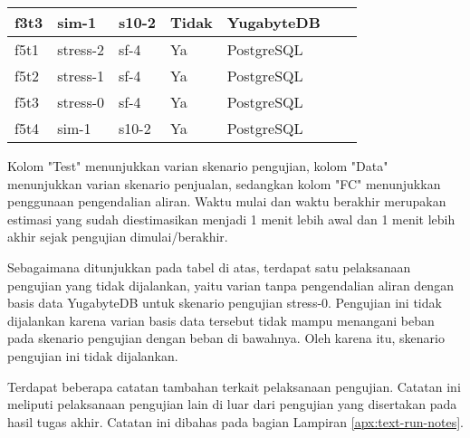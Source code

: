 \begin{table}[H]
\begin{tabular}{|l|l|l|l|l|l|l|}
        f3t3        & sim-1                 & s10-2             & Tidak                        & YugabyteDB          \\ \hline
        f5t1        & stress-2              & sf-4              & Ya                           & PostgreSQL          \\ \hline
        f5t2        & stress-1              & sf-4              & Ya                           & PostgreSQL          \\ \hline
        f5t3        & stress-0              & sf-4              & Ya                           & PostgreSQL          \\ \hline
        f5t4        & sim-1                 & s10-2             & Ya                           & PostgreSQL          \\ \hline
    \end{tabular}
\end{table}

Kolom "Test" menunjukkan varian skenario pengujian, kolom "Data" menunjukkan varian skenario penjualan, sedangkan kolom "FC" menunjukkan penggunaan pengendalian aliran. Waktu mulai dan waktu berakhir merupakan estimasi yang sudah diestimasikan menjadi 1 menit lebih awal dan 1 menit lebih akhir sejak pengujian dimulai/berakhir.

Sebagaimana ditunjukkan pada tabel di atas, terdapat satu pelaksanaan pengujian yang tidak dijalankan, yaitu varian tanpa pengendalian aliran dengan basis data YugabyteDB untuk skenario pengujian stress-0. Pengujian ini tidak dijalankan karena varian basis data tersebut tidak mampu menangani beban pada skenario pengujian dengan beban di bawahnya. Oleh karena itu, skenario pengujian ini tidak dijalankan.

Terdapat beberapa catatan tambahan terkait pelaksanaan pengujian. Catatan ini meliputi pelaksanaan pengujian lain di luar dari pengujian yang disertakan pada hasil tugas akhir. Catatan ini dibahas pada bagian Lampiran \ref{apx:text-run-notes}.
